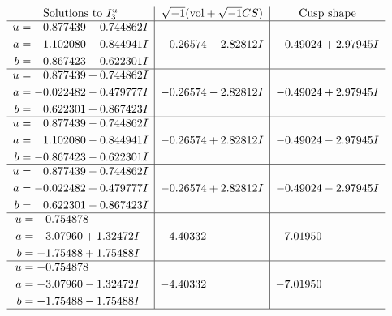 \documentclass[1p]{elsarticle_modified}
\theoremstyle{definition}
\newcommand{\I}{\sqrt{-1}}
\begin{document}
$$\begin{array}{c|c|c}  
\text{Solutions to }I^u_{3}& \I (\text{vol} + \sqrt{-1}CS) & \text{Cusp shape}\\
 \hline 
\begin{aligned}
u &= \phantom{-}0.877439 + 0.744862 I \\
a &= \phantom{-}1.102080 + 0.844941 I \\
b &= -0.867423 + 0.622301 I\end{aligned}
 & -0.26574 - 2.82812 I & -0.49024 + 2.97945 I \\ \hline\begin{aligned}
u &= \phantom{-}0.877439 + 0.744862 I \\
a &= -0.022482 - 0.479777 I \\
b &= \phantom{-}0.622301 + 0.867423 I\end{aligned}
 & -0.26574 - 2.82812 I & -0.49024 + 2.97945 I \\ \hline\begin{aligned}
u &= \phantom{-}0.877439 - 0.744862 I \\
a &= \phantom{-}1.102080 - 0.844941 I \\
b &= -0.867423 - 0.622301 I\end{aligned}
 & -0.26574 + 2.82812 I & -0.49024 - 2.97945 I \\ \hline\begin{aligned}
u &= \phantom{-}0.877439 - 0.744862 I \\
a &= -0.022482 + 0.479777 I \\
b &= \phantom{-}0.622301 - 0.867423 I\end{aligned}
 & -0.26574 + 2.82812 I & -0.49024 - 2.97945 I \\ \hline\begin{aligned}
u &= -0.754878\phantom{ +0.000000I} \\
a &= -3.07960 + 1.32472 I \\
b &= -1.75488 + 1.75488 I\end{aligned}
 & -4.40332\phantom{ +0.000000I} & -7.01950\phantom{ +0.000000I} \\ \hline\begin{aligned}
u &= -0.754878\phantom{ +0.000000I} \\
a &= -3.07960 - 1.32472 I \\
b &= -1.75488 - 1.75488 I\end{aligned}
 & -4.40332\phantom{ +0.000000I} & -7.01950\phantom{ +0.000000I}\\
 \hline 
 \end{array}$$\newpage\newpage\renewcommand{\arraystretch}{1}
\end{document}
